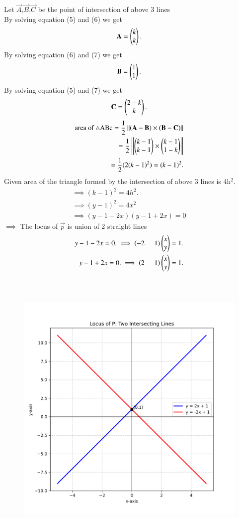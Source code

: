 \documentclass[journal]{IEEEtran}
\begin{document}
Let $\Vec{A}$,$\Vec{B}$,$\Vec{C}$ be the point of intersection of above 3 lines\\
By solving equation (5) and (6) we get
\begin{align}
    \Vec{A}=\myvec{k\\k}.
\end{align}
By solving equation (6) and (7) we get
\begin{align}
    \Vec{B}=\myvec{1\\1}.
\end{align}
By solving equation (5) and (7) we get
\begin{align}
    \Vec{C}=\myvec{2-k\\k}.
\end{align}
\begin{align}
    \text{area of }\triangle \text{ABc}=\frac{1}{2}\left\lVert(\mathbf{A}-\mathbf{B})\times(\mathbf{B}-\mathbf{C})\right\rVert\\
    =\frac{1}{2}\left\lVert\begin{pmatrix}k-1\\k-1\end{pmatrix}\times\begin{pmatrix}k-1\\1-k\end{pmatrix}\right\rVert\\
    =\frac{1}{2}(2(k-1)^2)=(k-1)^2.
\end{align}
Given area of the triangle formed by the intersection of above 3 lines is 4h$^2$.
\begin{align}
    \implies (k-1)^2= 4h^2.\\
    \implies (y-1)^2=4x^2\\
    \implies(y-1-2x)(y-1+2x)=0
    \end{align}
   $\implies$ The locus of $\vec{p}$ is union of 2 straight lines
   \begin{align}
     y-1-2x=0. \implies  \left(-2\hspace{0.5cm}1\right)\begin{pmatrix}x\\y\end{pmatrix}=1.\\
     y-1+2x=0. \implies  \left(2\hspace{0.5cm}1\right)\begin{pmatrix}x\\y\end{pmatrix}=1.
   \end{align}
   \\ \\ 
   \begin{figure}[H]
    \centering
    \includegraphics[width=0.96\columnwidth]{figs/01.png}
    \label{fig-1}
\end{figure}
\end{document}
